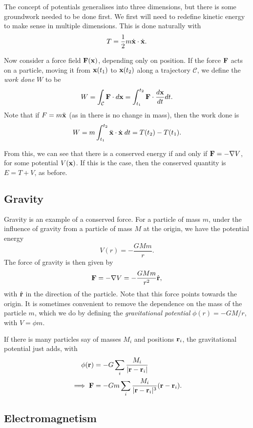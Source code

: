 \documentclass[a4paper]{scrartcl}
\newcommand{\hh}[1]{\hat{\vv{#1}}}
\begin{document}
The concept of potentials generalises into three dimensions, but there is some groundwork needed to be done first. We first will need to redefine kinetic energy to make sense in multiple dimensions. This is done naturally with 
$$
T = \frac{1}{2} m \dot{\mathbf{x}} \cdot \dot{\mathbf{x}}.
$$

Now consider a force field $\mathbf{F}(\mathbf{x})$, depending only on position.  If the force $\mathbf{F}$ acts on a particle, moving it from $\mathbf{x}(t_1)$ to $\mathbf{x}(t_2)$ along a trajectory $\mathcal{C}$, we define the \emph{work done} $W$ to be
$$
W = \int_\mathcal{C} \mathbf{F} \cdot d \mathbf{x} = \int_{t_1}^{t_2} \mathbf{F} \cdot \frac{d \mathbf{x}}{d t} d t.
$$
Note that if $F = m \ddot{\mathbf{x}}$ (as in there is no change in mass), then the work done is
$$
W = m \int_{t_1}^{t_2} \ddot{\mathbf{x}} \cdot \dot{\mathbf{x}} \; dt = T(t_2) - T(t_1).
$$

From this, we can see that there is a conserved energy if and only if $\mathbf{F} = - \nabla V$, for some potential $V(\mathbf{x})$. If this is the case, then the conserved quantity is $E = T + V$, as before.

\subsection{Gravity}

Gravity is an example of a conserved force. For a particle of mass $m$, under the influence of gravity from a particle of mass $M$ at the origin, we have the potential energy
$$
V(r) = -\frac{GMm}{r}.
$$
The force of gravity is then given by
$$
\vv F = - \nabla V = -\frac{G Mm}{r^2} \hh r,
$$
with $\hh r$ in the direction of the particle. Note that this force points towards the origin.
It is sometimes convenient to remove the dependence on the mass of the particle $m$, which we do by defining the \emph{gravitational potential} $\phi(r) = -GM/r$, with $V = \phi m$.

If there is many particles say of masses $M_i$ and positions $\mathbf{r}_i$, the gravitational potential just adds, with 
\begin{align*}
	\phi(\mathbf{r}) &= -G \sum_i \frac{M_i}{|\mathbf{r} - \mathbf{r}_i|} \\
\implies \mathbf{F} &= -Gm \sum_i \frac{M_i}{|\mathbf{r} - \mathbf{r}_i|^3} (\mathbf{r} - \mathbf{r}_i).
\end{align*}

\subsection{Electromagnetism}
\end{document}
